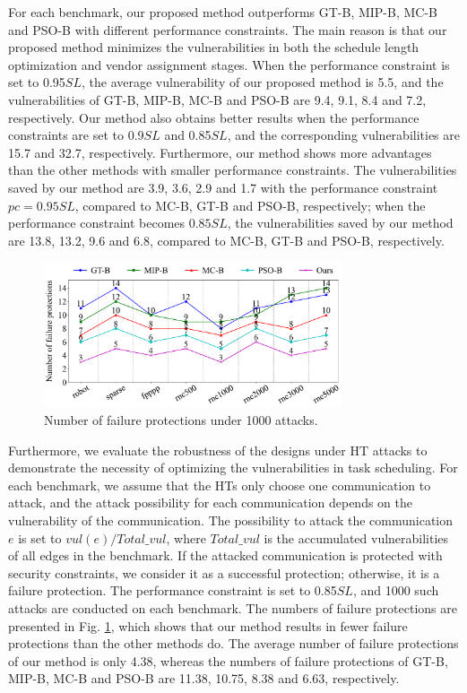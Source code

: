 \documentclass[10pt,journal, compsoc]{IEEEtran}
\begin{document}
For each benchmark, our proposed method outperforms GT-B, MIP-B, MC-B and PSO-B with different performance constraints. The main reason is that our proposed method minimizes the vulnerabilities in both the schedule length optimization and vendor assignment stages. When the performance constraint is set to 0.95$SL$, the average vulnerability of our proposed method is 5.5, and the vulnerabilities of GT-B, MIP-B, MC-B and PSO-B are 9.4, 9.1, 8.4 and 7.2, respectively. Our method also obtains better results when the performance constraints are set to 0.9$SL$ and 0.85$SL$, and the corresponding vulnerabilities are 15.7 and 32.7, respectively. Furthermore, our method shows more advantages than the other methods with smaller performance constraints. The vulnerabilities saved by our method are 3.9, 3.6, 2.9 and 1.7 with the performance constraint $pc=0.95SL$, compared to MC-B, GT-B and PSO-B, respectively; when the performance constraint becomes $0.85SL$, the vulnerabilities saved by our method are 13.8, 13.2, 9.6 and 6.8, compared to MC-B, GT-B and PSO-B, respectively.

\begin{figure}[!t]
\centering
\includegraphics[width=8.8cm]{figure/failure_protection.pdf}
\caption{Number of failure protections under 1000 attacks.}
\label{fig:failure_protection}
\end{figure}

Furthermore, we evaluate the robustness of the designs under HT attacks to demonstrate the necessity of optimizing the vulnerabilities in task scheduling. For each benchmark, we assume that the HTs only choose one communication to attack, and the attack possibility for each communication depends on the vulnerability of the communication. The possibility to attack the communication $e$ is set to $vul(e)/Total\_vul$, where $Total\_vul$ is the accumulated vulnerabilities of all edges in the benchmark. If the attacked communication is protected with security constraints, we consider it as a successful protection; otherwise, it is a failure protection. The performance constraint is set to 0.85$SL$, and 1000 such attacks are conducted on each benchmark. The numbers of failure protections are presented in Fig. \ref{fig:failure_protection}, which shows that our method results in fewer failure protections than the other methods do. The average number of failure protections of our method is only 4.38, whereas the numbers of failure protections of GT-B, MIP-B, MC-B and PSO-B are 11.38, 10.75, 8.38 and 6.63, respectively.
\end{document}
